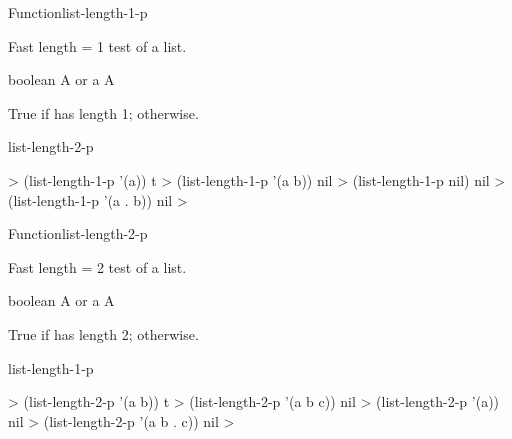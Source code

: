\documentclass[10pt,twoside,english,pdftex]{article}
\begin{document}
\begin{functiondoc}{Function}{list-length-1-p}{%
    }
%
%

\fnsyntax

\fnpurpose Fast length = 1 test of a list.

\fnpackage {}

\fnmodule {}

\fnargs
\begin{args}{boolean}
\arg[list] A  or a 
\arg[boolean] A 
\end{args}

\fnreturns True if  has length 1; \nil{} otherwise.

\begin{alsos}{list-length-2-p}
\end{alsos}

\fnexamples
%
\W\supp
\begin{example}
  > (list-length-1-p '(a))
  t
  > (list-length-1-p '(a b))
  nil
  > (list-length-1-p nil)
  nil
  > (list-length-1-p '(a . b))
  nil
  >
\end{example}

\end{functiondoc}


\begin{functiondoc}{Function}{list-length-2-p}{%
    }
%
%

\fnsyntax

\fnpurpose Fast length = 2 test of a list.

\fnpackage {}

\fnmodule {}

\fnargs
\begin{args}{boolean}
\arg[list] A  or a 
\arg[boolean] A 
\end{args}

\fnreturns True if  has length 2; \nil{} otherwise.

\begin{alsos}{list-length-1-p}
\end{alsos}

\fnexamples
%
\W\supp
\begin{example}
  > (list-length-2-p '(a b))
  t
  > (list-length-2-p '(a b c))
  nil
  > (list-length-2-p '(a))
  nil
  > (list-length-2-p '(a b . c))
  nil
  >
\end{example}

\end{functiondoc}
\end{document}
